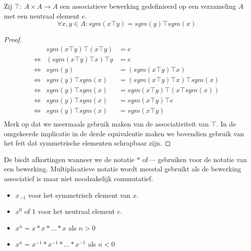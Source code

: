 \documentclass[main.tex]{subfiles}
\begin{document}
\begin{st}
  \label{st:rekenregel-symmetrische-elementen}
  Zij $\top:\ A\times A\rightarrow A$ een associatieve bewerking gedefinieerd op een verzameling $A$ met een neutraal element $e$.
  \[ \forall x, y \in A: sym(x\top y) = sym(y) \top sym(x) \]

  \begin{proof}
    \[
    \begin{array}{rrl}
                      & sym(x\top y) \top (x\top y)  &= e \\
      \Leftrightarrow & (sym(x\top y) \top x) \top y &= e \\
      \Leftrightarrow & sym(y) &= (sym(x\top y) \top x) \\
      \Leftrightarrow & sym(y) \top sym(x) &= (sym(x\top y) \top x) \top sym(x) \\
      \Leftrightarrow & sym(y) \top sym(x) &= sym(x\top y) \top (x \top sym(x)) \\
      \Leftrightarrow & sym(y) \top sym(x) &= sym(x\top y) \top e \\
      \Leftrightarrow & sym(y) \top sym(x) &= sym(x\top y) \\
    \end{array}
    \]
    Merk op dat we meermaals gebruik maken van de associativiteit van $\top$.
    In de omgekeerde implicatie in de derde equivalentie maken we bovendien gebruik van het feit dat symmetrische elementen schrapbaar zijn.
  \end{proof}
\end{st}


\begin{de}
  \label{multiplicatieve-notatie}
  De  biedt afkortingen wanneer we de notatie $*$ of $\cdots$ gebruiken voor de notatie van een bewerking.
  Multiplicatieve notatie wordt meestal gebruikt als de bewerking associatief is maar niet noodzakelijk commutatief.
  \begin{itemize}
  \item $x_{-1}$ voor het symmetrisch element van $x$.
  \item $x^{0}$ of $1$ voor het neutraal element $e$.
  \item $x^{n} = x * x * \dotsc * x$ als $n > 0$
  \item $x^{n} = x^{-1} * x^{-1} * \dotsc * x^{-1}$ als $n < 0$
  \end{itemize}
\end{de}
\end{document}
